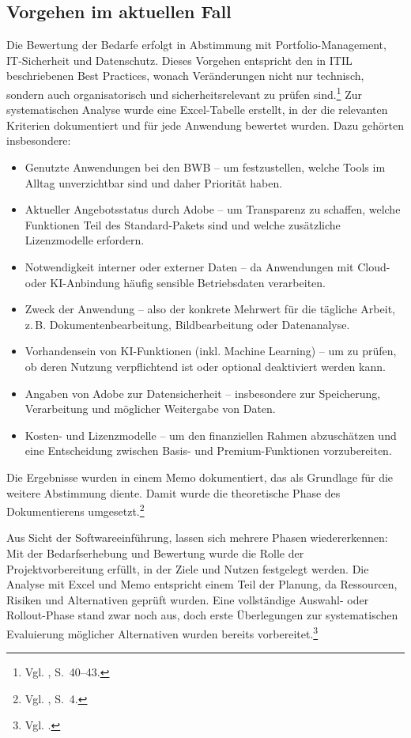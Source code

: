 \documentclass[
    12pt, 
    a4paper,
    ]{scrartcl} %
\begin{document}
\subsection{Vorgehen im aktuellen Fall}
Die Bewertung der Bedarfe erfolgt in Abstimmung mit Portfolio-Management, IT-Sicherheit und Datenschutz. Dieses Vorgehen entspricht den in ITIL beschriebenen Best Practices, wonach Veränderungen nicht nur technisch, sondern auch organisatorisch und sicherheitsrelevant zu prüfen sind.\footnote{Vgl. \cite{S_ITIL}, S.~40--43.} Zur systematischen Analyse wurde eine Excel-Tabelle erstellt, in der die relevanten Kriterien dokumentiert und für jede Anwendung bewertet wurden. Dazu gehörten insbesondere:
\begin{itemize}
  \item Genutzte Anwendungen bei den BWB – um festzustellen, welche Tools im Alltag unverzichtbar sind und daher Priorität haben.
  \item Aktueller Angebotsstatus durch Adobe – um Transparenz zu schaffen, welche Funktionen Teil des Standard-Pakets sind und welche zusätzliche Lizenzmodelle erfordern.
  \item Notwendigkeit interner oder externer Daten – da Anwendungen mit Cloud- oder KI-Anbindung häufig sensible Betriebsdaten verarbeiten.
  \item Zweck der Anwendung – also der konkrete Mehrwert für die tägliche Arbeit, z.\,B. Dokumentenbearbeitung, Bildbearbeitung oder Datenanalyse.
  \item Vorhandensein von KI-Funktionen (inkl. Machine Learning) – um zu prüfen, ob deren Nutzung verpflichtend ist oder optional deaktiviert werden kann.
  \item Angaben von Adobe zur Datensicherheit – insbesondere zur Speicherung, Verarbeitung und möglicher Weitergabe von Daten.
  \item Kosten- und Lizenzmodelle – um den finanziellen Rahmen abzuschätzen und eine Entscheidung zwischen Basis- und Premium-Funktionen vorzubereiten.
\end{itemize}

Die Ergebnisse wurden in einem Memo dokumentiert, das als Grundlage für die weitere Abstimmung diente. Damit wurde die theoretische Phase des Dokumentierens umgesetzt.\footnote{Vgl. \cite{S_PohlRupp}, S.~4.}

Aus Sicht der Softwareeinführung, lassen sich mehrere Phasen wiedererkennen: Mit der Bedarfserhebung und Bewertung wurde die Rolle der Projektvorbereitung erfüllt, in der Ziele und Nutzen festgelegt werden. Die Analyse mit Excel und Memo entspricht einem Teil der Planung, da Ressourcen, Risiken und Alternativen geprüft wurden. Eine vollständige Auswahl- oder Rollout-Phase stand zwar noch aus, doch erste Überlegungen zur systematischen Evaluierung möglicher Alternativen wurden bereits vorbereitet.\footnote{Vgl. \cite{pureconsultant2023}.}
\end{document}
